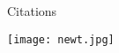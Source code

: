Citations \cite{van1677concerning}

\begin{figure*}[!htp]
    \texttt{[image: newt.jpg]} %
\end{figure*}

